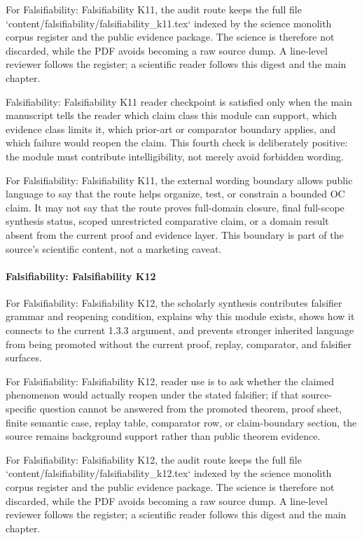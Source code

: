 For Falsifiability: Falsifiability K11, the audit route keeps the full file `content/falsifiability/falsifiability\_k11.tex` indexed by the science monolith corpus register and the public evidence package. The science is therefore not discarded, while the PDF avoids becoming a raw source dump. A line-level reviewer follows the register; a scientific reader follows this digest and the main chapter.


Falsifiability: Falsifiability K11 reader checkpoint is satisfied only when the main manuscript tells the reader which claim class this module can support, which evidence class limits it, which prior-art or comparator boundary applies, and which failure would reopen the claim. This fourth check is deliberately positive: the module must contribute intelligibility, not merely avoid forbidden wording.


For Falsifiability: Falsifiability K11, the external wording boundary allows public language to say that the route helps organize, test, or constrain a bounded OC claim. It may not say that the route proves full-domain closure, final full-scope synthesis status, scoped unrestricted comparative claim, or a domain result absent from the current proof and evidence layer. This boundary is part of the source's scientific content, not a marketing caveat.


\paragraph{Falsifiability: Falsifiability K12}

For Falsifiability: Falsifiability K12, the scholarly synthesis contributes falsifier grammar and reopening condition, explains why this module exists, shows how it connects to the current 1.3.3 argument, and prevents stronger inherited language from being promoted without the current proof, replay, comparator, and falsifier surfaces.


For Falsifiability: Falsifiability K12, reader use is to ask whether the claimed phenomenon would actually reopen under the stated falsifier; if that source-specific question cannot be answered from the promoted theorem, proof sheet, finite semantic case, replay table, comparator row, or claim-boundary section, the source remains background support rather than public theorem evidence.


For Falsifiability: Falsifiability K12, the audit route keeps the full file `content/falsifiability/falsifiability\_k12.tex` indexed by the science monolith corpus register and the public evidence package. The science is therefore not discarded, while the PDF avoids becoming a raw source dump. A line-level reviewer follows the register; a scientific reader follows this digest and the main chapter.


